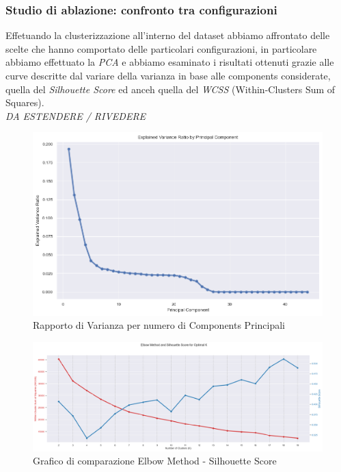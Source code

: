 \documentclass[12pt,a4paper,twoside]{article}
\begin{document}
\subsubsection{Studio di ablazione: confronto tra configurazioni}
Effetuando la clusterizzazione all'interno del dataset abbiamo affrontato delle scelte che hanno 
comportato delle particolari configurazioni, in particolare abbiamo effettuato la \textit{PCA} e 
abbiamo esaminato i risultati ottenuti grazie alle curve descritte dal variare della varianza in 
base alle components considerate, quella del \textit{Silhouette Score} ed anceh quella del 
\textit{WCSS} (Within-Clusters Sum of Squares).\\
\textit{DA ESTENDERE / RIVEDERE}
\begin{figure}[h!]
    \centering
    \includegraphics[width=\textwidth, height=\textheight, keepaspectratio]{assets/variance-ratio.png}
    \caption{Rapporto di Varianza per numero di Components Principali}
    \label{fig:variance-ratio}
\end{figure}
\begin{figure}[h!]
    \centering
    \includegraphics[width=\textwidth, height=\textheight, keepaspectratio]{assets/elbow-silhouette.png}
    \caption{Grafico di comparazione Elbow Method - Silhouette Score}
    \label{fig:elbow-silhouette}
\end{figure}
\end{document}
